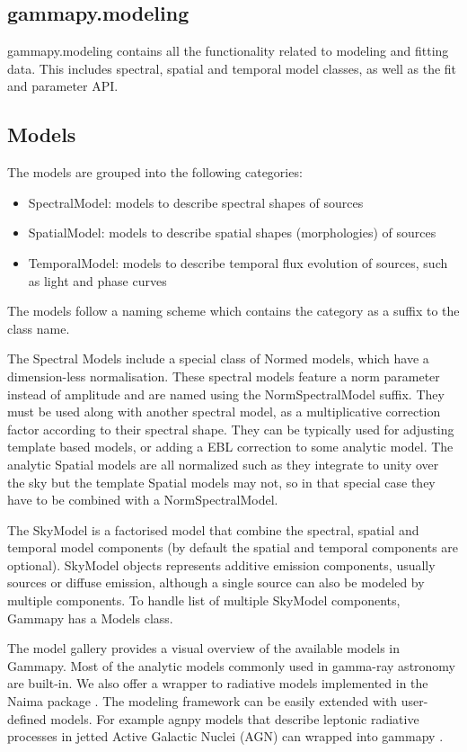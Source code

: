 \subsection{gammapy.modeling}
\label{ssec:gammapy-modeling}

gammapy.modeling contains all the functionality related to modeling and fitting data. This includes spectral, spatial and temporal model classes, as well as the fit and parameter API.

\subsection{Models}
\label{ssec:models}

The models are grouped into the following categories:
\begin{itemize}
\item SpectralModel: models to describe spectral shapes of sources
\item SpatialModel: models to describe spatial shapes (morphologies) of sources
\item TemporalModel: models to describe temporal flux evolution of sources, such as light and phase curves
\end{itemize}
The models follow a naming scheme which contains the category as a suffix to the class name.

The  Spectral Models include a special class of Normed models, which have a dimension-less normalisation. These spectral models feature a norm parameter instead of amplitude and are named using the NormSpectralModel suffix. They must be used along with another spectral model, as a multiplicative correction factor according to their spectral shape. They can be typically used for adjusting template based models, or adding a EBL correction to some analytic model. The analytic Spatial models are all normalized such as they integrate to unity over the sky but the template Spatial models may not, so in that special case they have to be combined with a NormSpectralModel.

The SkyModel is a factorised model that combine the spectral, spatial and temporal model components (by default the spatial and temporal components are optional).
SkyModel objects represents additive emission components, usually sources or diffuse emission, although a single source can also be modeled by multiple components.
To handle list of multiple SkyModel components, Gammapy has a Models class.

The model gallery provides a visual overview of the available models in Gammapy.
Most of the analytic models  commonly used in gamma-ray astronomy are built-in. We also offer a wrapper to radiative models implemented in the Naima package \cite{naima}. The modeling framework can be easily extended with user-defined models. For example agnpy models that describe leptonic radiative processes in jetted Active Galactic Nuclei (AGN) can wrapped into gammapy \citep[see section3.5 of ][]{2021arXiv211214573N} .

